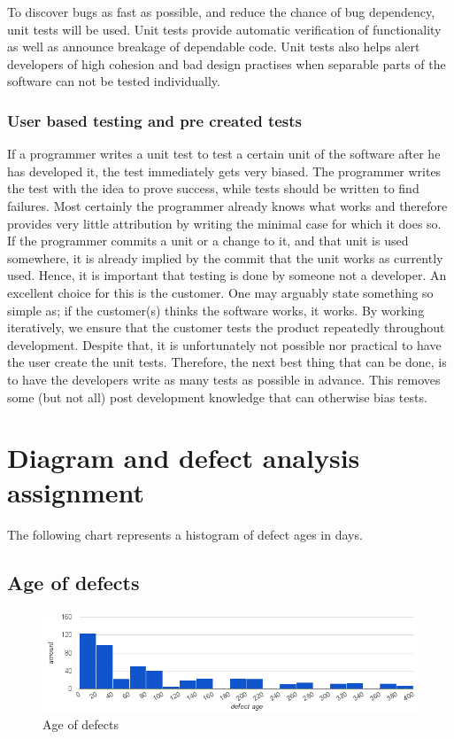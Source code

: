 \documentclass{article}
\begin{document}
To discover bugs as fast as possible, and reduce the chance of bug dependency, unit tests will be used.
Unit tests provide automatic verification of functionality as well as announce breakage of dependable code.
Unit tests also helps alert developers of high cohesion and bad design practises when separable parts of the software can not be tested individually.

\subsubsection{User based testing and pre created tests}
If a programmer writes a unit test to test a certain unit of the software after he has developed it, the test immediately gets very biased.
The programmer writes the test with the idea to prove success, while tests should be written to find failures.
Most certainly the programmer already knows what works and therefore provides very little attribution by writing the minimal case for which it does so. 
If the programmer commits a unit or a change to it, and that unit is used somewhere, it is already implied by the commit that the unit works as currently used.
Hence, it is important that testing is done by someone not a developer.
An excellent choice for this is the customer.
One may arguably state something so simple as; if the customer(s) thinks the software works, it works.
By working iteratively, we ensure that the customer tests the product repeatedly throughout development.
Despite that, it is unfortunately not possible nor practical to have the user create the unit tests.
Therefore, the next best thing that can be done, is to have the developers write as many tests as possible in advance.
This removes some (but not all) post development knowledge that can otherwise bias tests.

\section{Diagram and defect analysis assignment}
The following chart represents a histogram of defect ages in days.
\subsection{Age of defects}
\begin{figure}[h]
\center
\includegraphics[width=160mm]{defect_ages.png}
\caption{Age of defects}
\end{figure}
\end{document}
